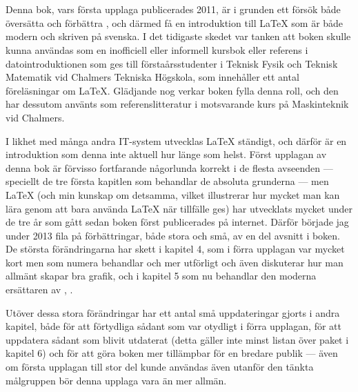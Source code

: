 \documentclass[10pt,../../a4.tex]{subfiles}
\begin{document}
\makeatletter
{}
\makeatother

\chapter*{\prefacename}
\thispagestyle{empty}
\markboth{\MakeMarkcase{\prefacename}}{\MakeMarkcase{\prefacename}}
Denna bok, vars första upplaga publicerades 2011, är i grunden ett försök
både översätta och förbättra 
\parencite{Oetiker11}, och därmed få en introduktion till \LaTeX{} som är
både modern och skriven på svenska. I det tidigaste skedet var tanken att
boken skulle kunna användas som en inofficiell eller informell kursbok
eller referens i datointroduktionen som ges till förstaårsstudenter i
Teknisk Fysik och Teknisk Matematik vid Chalmers Tekniska Högskola, som
innehåller ett antal föreläsningar om \LaTeX{}. Glädjande nog verkar boken
fylla denna roll, och den har dessutom använts som referenslitteratur i
motsvarande kurs på Maskinteknik vid Chalmers.

I likhet med många andra IT-system utvecklas \LaTeX{} ständigt, och därför
är en introduktion som denna inte aktuell hur länge som helst. Först
upplagan av denna bok är förvisso fortfarande någorlunda korrekt i de
flesta avseenden — speciellt de tre första kapitlen som behandlar de
absoluta grunderna — men \LaTeX{} (och min kunskap om detsamma, vilket
illustrerar hur mycket man kan lära genom att bara använda \LaTeX{} när
tillfälle ges) har utvecklats mycket under de tre år som gått sedan boken
först publicerades på internet. Därför började jag under 2013 fila på
förbättringar, både stora och små, av en del avsnitt i boken. De största
förändringarna har skett i kapitel 4, som i förra upplagan var mycket kort
men som numera behandlar \PGFTikZ{} och  mer utförligt
och även diskuterar hur man allmänt skapar bra grafik, och i kapitel 5
som nu behandlar den moderna ersättaren av \BibTeX, .

Utöver dessa stora förändringar har ett antal små uppdateringar gjorts
i andra kapitel, både för att förtydliga sådant som var otydligt i förra
upplagan, för att uppdatera sådant som blivit utdaterat (detta gäller inte
minst listan över paket i kapitel 6) och för att göra boken mer tillämpbar
för en bredare publik — även om första upplagan till stor del kunde
användas även utanför den tänkta målgruppen bör denna upplaga vara än
mer allmän.
\end{document}
